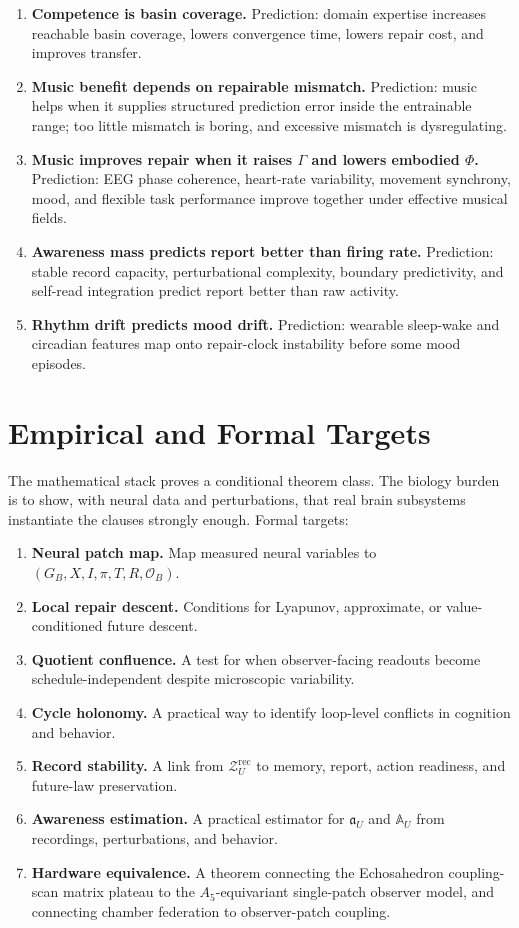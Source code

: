 \documentclass[11pt]{article}
\theoremstyle{remark}
\theoremstyle{plain}
\newcommand{\rec}{\mathrm{rec}}
\begin{document}
\begin{enumerate}
\item \textbf{Competence is basin coverage.} Prediction: domain expertise increases reachable basin coverage, lowers convergence time, lowers repair cost, and improves transfer.
\item \textbf{Music benefit depends on repairable mismatch.} Prediction: music helps when it supplies structured prediction error inside the entrainable range; too little mismatch is boring, and excessive mismatch is dysregulating.
\item \textbf{Music improves repair when it raises \(\Gamma\) and lowers embodied \(\Phi\).} Prediction: EEG phase coherence, heart-rate variability, movement synchrony, mood, and flexible task performance improve together under effective musical fields.
\item \textbf{Awareness mass predicts report better than firing rate.} Prediction: stable record capacity, perturbational complexity, boundary predictivity, and self-read integration predict report better than raw activity.
\item \textbf{Rhythm drift predicts mood drift.} Prediction: wearable sleep-wake and circadian features map onto repair-clock instability before some mood episodes.
\end{enumerate}

\section{Empirical and Formal Targets}

The mathematical stack proves a conditional theorem class. The biology burden is to show, with neural data and perturbations, that real brain subsystems instantiate the clauses strongly enough. Formal targets:

\begin{enumerate}
\item \textbf{Neural patch map.} Map measured neural variables to \((G_B,X,I,\pi,T,R,\mathcal O_B)\).
\item \textbf{Local repair descent.} Conditions for Lyapunov, approximate, or value-conditioned future descent.
\item \textbf{Quotient confluence.} A test for when observer-facing readouts become schedule-independent despite microscopic variability.
\item \textbf{Cycle holonomy.} A practical way to identify loop-level conflicts in cognition and behavior.
\item \textbf{Record stability.} A link from \(\mathcal Z_U^{\rec}\) to memory, report, action readiness, and future-law preservation.
\item \textbf{Awareness estimation.} A practical estimator for \(\mathfrak a_U\) and \(\mathbb A_U\) from recordings, perturbations, and behavior.
\item \textbf{Hardware equivalence.} A theorem connecting the Echosahedron coupling-scan matrix plateau to the \(A_5\)-equivariant single-patch observer model, and connecting chamber federation to observer-patch coupling.
\end{enumerate}
\end{document}

